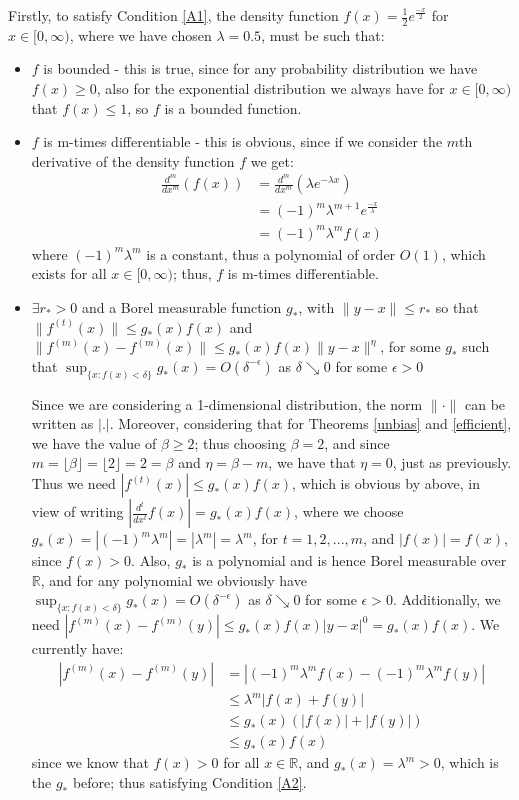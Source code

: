 \documentclass[12pt]{report}
\begin{document}
Firstly, to satisfy Condition \ref{A1}, the density function $f(x) =  \frac{1}{2}e^{\frac{-x}{2}}$ for $x \in [0, \infty)$, where we have chosen $\lambda = 0.5$, must be such that:
\begin{itemize}
\item $f$ is bounded - this is true, since for any probability distribution we have $f(x) \geq 0$, also for the exponential distribution we always have for $x \in [0, \infty)$ that $f(x) \leq 1$, so $f$ is a bounded function.

\item $f$ is m-times differentiable - this is obvious, since if we consider the $m$th derivative of the density function $f$ we get:
\begin{align*}
\frac{d^m}{dx^m}(f(x)) &= \frac{d^m}{dx^m}(\lambda e^{-\lambda x}) \\
&= (-1)^{m} \lambda^{m+1} e^{\frac{-x}{\lambda}} \\
&= (-1)^{m} \lambda^{m} f(x)
\end{align*}
 where $(-1)^{m} \lambda^{m}$ is a constant, thus a polynomial of order $O(1)$, which exists for all $x \in [0, \infty)$; thus, $f$ is m-times differentiable.

\item $\exists r_{*} > 0$ and a Borel measurable function $g_{*}$, with $\|y-x\| \leq r_{*}$ so that $\|f^{(t)}(x)\| \leq g_{*}(x) f(x)$ and $\|f^{(m)}(x) - f^{(m)}(x)\| \leq g_{*}(x) f(x)\|y - x\|^{\eta}$, for some $g_{*}$ such that $\sup_{\{x : f(x) < \delta\}} g_{*}(x) = O(\delta^{-\epsilon})$ as $\delta \searrow 0$ for some $\epsilon >0$

Since we are considering a 1-dimensional distribution, the norm $\| \cdot \|$ can be written as $|.|$. Moreover, considering that for Theorems \ref{unbias} and \ref{efficient}, we have the value of $\beta \geq 2$; thus choosing $\beta = 2$, and since $m = \lfloor \beta \rfloor =  \lfloor 2 \rfloor = 2 = \beta$ and $\eta = \beta -m$, we have that $\eta =0$, just as previously. Thus we need  $|f^{(t)}(x)| \leq g_{*}(x) f(x)$, which is obvious by above, in view of writing $|\frac{d^t}{dx^t} f(x)| = g_{*}(x) f(x)$, where we choose $ g_{*}(x) = |(-1)^{m} \lambda^{m}| = |\lambda^{m}| = \lambda^{m}$, for $t=1,2,...,m$, and $|f(x)| = f(x)$, since $f(x) >0$. Also, $g_{*}$ is a polynomial and is hence Borel measurable over $\mathbb{R}$, and for any polynomial we obviously have $\sup_{\{x : f(x) < \delta\}} g_{*}(x) = O(\delta^{-\epsilon})$ as $\delta \searrow 0$ for some $\epsilon >0$. Additionally, we need $|f^{(m)}(x) - f^{(m)}(y)| \leq g_{*}(x) f(x)|y - x|^{0} = g_{*}(x) f(x)$. We currently have:
\begin{align*}
|f^{(m)}(x) - f^{(m)}(y)| &= | (-1)^{m} \lambda^{m} f(x) - (-1)^{m} \lambda^{m} f(y) | \\
&\leq \lambda^{m} | f(x) + f(y) | \\
&\leq g_{*}(x) (| f(x)| + |f(y)| )\\
&\leq g_{*}(x)f(x)
\end{align*}
since we know that $f(x) >0$ for all $x \in \mathbb{R}$, and $g_{*}(x) = \lambda^{m} >0$, which is the $g_{*}$ before; thus satisfying Condition \ref{A2}.

\end{itemize}
\end{document}
